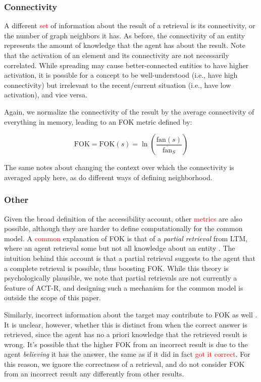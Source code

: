 \documentclass[10pt,letterpaper]{article}
\newcommand{\fixme}[2][]{#2}
\renewcommand{\fixme}[2][]{\textcolor{red}{#2}}
\newcommand{\fok}[0]{\text{FOK}}
\begin{document}
\subsubsection{Connectivity}

A different \fixme{set} of information about the result of a retrieval is its connectivity, or the number of graph neighbors it has.
As before, the connectivity of an entity represents the amount of knowledge that the agent has about the result.
Note that the activation of an element and its connectivity are not necessarily correlated.
While spreading may cause better-connected entities to have higher activation, it is possible for a concept to be well-understood (i.e., have high connectivity) but irrelevant to the recent/current situation (i.e., have low activation), and vice versa.

Again, we normalize the connectivity of the result by the average connectivity of everything in memory, leading to an FOK metric defined by:

$$\fok = \fok(s) = \ln(\frac{\text{fan}(s)}{\overline{\text{fan}}_S})$$

The same notes about changing the context over which the connectivity is averaged apply here, as do different ways of defining neighborhood.

\subsubsection{Other}

Given the broad definition of the accessibility account, other \fixme{metrics} are also possible, although they are harder to define computationally for the common model.
A \fixme{common} explanation of FOK is that of a \emph{partial retrieval} from LTM, where an agent retrieval some but not all knowledge about an entity \cite{Hanczakowski2017MetamemoryInA}.
The intuition behind this account is that a partial retrieval suggests to the agent that a complete retrieval is possible, thus boosting FOK.
While this theory is psychologically plausible, we note that partial retrievals are not currently a feature of ACT-R, and designing such a mechanism for the common model is outside the scope of this paper.

Similarly, incorrect information about the target may contribute to FOK as well \cite{Koriat1993HowDoWe,Koriat1995DissociatingKnowingAnd}.
It is unclear, however, whether this is distinct from when the correct answer is retrieved, since the agent has no a priori knowledge that the retrieved result is wrong.
It's possible that the higher FOK from an incorrect result is due to the agent \emph{believing} it has the answer, the same as if it did in fact \fixme{got it correct}.
For this reason, we ignore the correctness of a retrieval, and do not consider FOK from an incorrect result any differently from other results.
\end{document}
